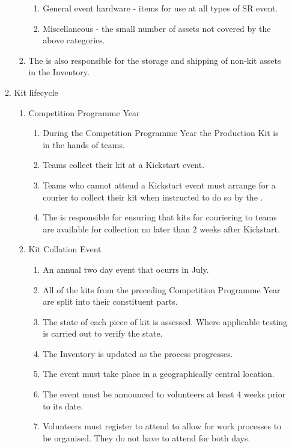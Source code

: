 \begin{enumerate}
\begin{enumerate}
\begin{enumerate}
\begin{enumerate}
          \item General event hardware - items for use at all types of SR event.
          \item Miscellaneous - the small number of assets not covered by the above categories.
        \end{enumerate}
      \item The  is also responsible for the storage and shipping of non-kit assets in the Inventory.
    \end{enumerate}
  \item Kit lifecycle
    \begin{enumerate}
      \item Competition Programme Year
        \begin{enumerate}
          \item During the Competition Programme Year the Production Kit is in the hands of teams.
          \item Teams collect their kit at a Kickstart event.
          \item Teams who cannot attend a Kickstart event must arrange for a courier to collect their kit when instructed to do so by the .
          \item The  is responsible for ensuring that kits for couriering to teams are available for collection no later than 2 weeks after Kickstart.
        \end{enumerate}
      \item Kit Collation Event
        \begin{enumerate}
          \item An annual two day event that ocurrs in July.
          \item All of the kits from the preceding Competition Programme Year are split into their constituent parts.
          \item The state of each piece of kit is assessed. Where applicable testing is carried out to verify the state.
          \item The Inventory is updated as the process progresses.
          \item The event must take place in a geographically central location.
          \item The event must be announced to volunteers at least 4 weeks prior to its date.
          \item Volunteers must register to attend to allow for work processes to be organised. They do not have to attend for both days.

\end{enumerate}
\end{enumerate}
\end{enumerate}
\end{enumerate}

